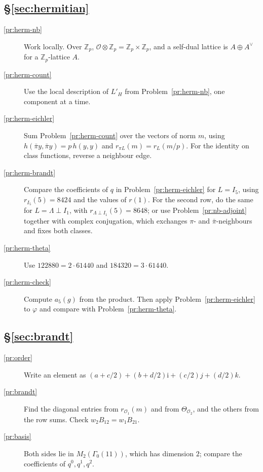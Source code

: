 \documentclass[reqno]{amsart}
\theoremstyle{definition}
\theoremstyle{plain}
\newcommand{\Z}{\mathbb{Z}}
\newcommand{\ii}{\mathrm{i}}
\newcommand{\Oc}{\mathcal{O}}
\begin{document}
\subsection*{\S\ref{sec:hermitian}}
\begin{description}
\item[\ref{pr:herm-nb}] Work locally.  Over \(\Z_p\), \(\Oc \otimes \Z_p = \Z_p \times \Z_p\), and a self-dual lattice is \(A \oplus A^\vee\) for a \(\Z_p\)-lattice \(A\).
\item[\ref{pr:herm-count}] Use the local description of \(L'_H\) from Problem~\ref{pr:herm-nb}, one component at a time.
\item[\ref{pr:herm-eichler}] Sum Problem~\ref{pr:herm-count} over the vectors of norm \(m\), using \(h(\bar\pi y, \bar\pi y) = p\, h(y,y)\) and \(r_{\pi L}(m) = r_L(m/p)\).  For the identity on class functions, reverse a neighbour edge.
\item[\ref{pr:herm-brandt}] Compare the coefficients of \(q\) in Problem~\ref{pr:herm-eichler} for \(L = I_5\), using \(r_{I_5}(5) = 8424\) and the values of \(r(1)\).  For the second row, do the same for \(L = \Lambda \perp I_1\), with \(r_{\Lambda \perp I_1}(5) = 8648\); or use Problem~\ref{pr:nb-adjoint} together with complex conjugation, which exchanges \(\pi\)- and \(\bar\pi\)-neighbours and fixes both classes.
\item[\ref{pr:herm-theta}] Use \(122880 = 2 \cdot 61440\) and \(184320 = 3 \cdot 61440\).
\item[\ref{pr:herm-check}] Compute \(a_5(g)\) from the product.  Then apply Problem~\ref{pr:herm-eichler} to \(\varphi\) and compare with Problem~\ref{pr:herm-theta}.
\end{description}

\subsection*{\S\ref{sec:brandt}}
\begin{description}
\item[\ref{pr:order}] Write an element as \((a + c/2) + (b + d/2)\ii + (c/2)j + (d/2)k\).
\item[\ref{pr:brandt}] Find the diagonal entries from \(r_{\Oc_1}(m)\) and from \(\Theta_{\Oc_2}\), and the others from the row sums.  Check \(w_2B_{12} = w_1B_{21}\).
\item[\ref{pr:basis}] Both sides lie in \(M_2(\Gamma_0(11))\), which has dimension \(2\); compare the coefficients of \(q^0, q^1, q^2\).
\end{description}
\end{document}
